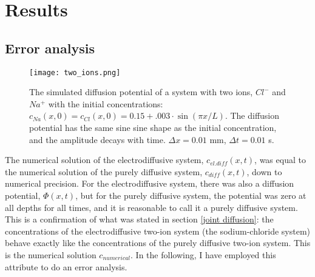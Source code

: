 \documentclass{article}
\begin{document}
\section{Results}
\subsection{Error analysis}\label{numerical vs analytical}

\begin{figure}
  \texttt{[image: two\_ions.png]}
  \caption{The simulated diffusion potential of a system with two ions, $Cl^-$ and $Na^+$ with the initial concentrations: $c_{Na}(x,0)=c_{Cl}(x,0)=0.15 + .003\cdot \sin(\pi x/L)$. The diffusion potential has the same sine sine shape as the initial concentration, and the amplitude decays with time. $\Delta x = 0.01$ mm, $\Delta t = 0.01 $ s. }
  \label{fig:two_ions}
\end{figure}

The numerical solution of the electrodiffusive system, $c_{el.diff}(x,t)$, was equal to the numerical solution of the purely diffusive system, $c_{diff}(x,t)$, down to numerical precision. For the electrodiffusive system, there was also a diffusion potential, $\Phi(x,t)$, but for the purely diffusive system, the potential was zero at all depths for all times, and it is reasonable to call it a purely diffusive system. This is a confirmation of what was stated in section \ref{joint diffusion}: the concentrations of the electrodiffusive two-ion system (the sodium-chloride system) behave exactly like the concentrations of the purely diffusive two-ion system. This is the numerical solution $c_{numerical}$. In the following, I have employed this attribute to do an error analysis. 
\end{document}
